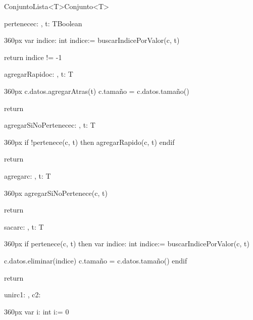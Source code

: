 \documentclass[10pt,a4paper]{article}
\begin{document}
\begin{ModuloImplements}{ConjuntoLista<T>}{Conjunto<T>}
  \begin{proc}{pertenece}{\In c: , \In t: T}{Boolean}
    \begin{ImplementationCode}{360px}
      var indice: int
          indice:= buscarIndicePorValor(c, t)

      return indice != -1
    \end{ImplementationCode}
  \end{proc}
  \begin{proc}{agregarRapido}{\Inout c: , t: T}{}
    \begin{ImplementationCode}{360px}
      c.datos.agregarAtras(t)
      c.tamaño = c.datos.tamaño()

      return
    \end{ImplementationCode}
  \end{proc}
  \begin{proc}{agregarSiNoPertenece}{\Inout c: , t: T}{}
    \begin{ImplementationCode}{360px}
      if !pertenece(c, t) then
        agregarRapido(c, t)
      endif

      return
    \end{ImplementationCode}
  \end{proc}
  \begin{proc}{agregar}{\Inout c: , t: T}{}
    \begin{ImplementationCode}{360px}
      agregarSiNoPertenece(c, t)

      return
    \end{ImplementationCode}
  \end{proc}
  \begin{proc}{sacar}{\Inout c: , t: T}{}
    \begin{ImplementationCode}{360px}
      if pertenece(c, t) then
        var indice: int
            indice:= buscarIndicePorValor(c, t)

        c.datos.eliminar(indice)
        c.tamaño = c.datos.tamaño()
      endif

      return
    \end{ImplementationCode}
  \end{proc}
  \begin{proc}{unir}{\Inout c1: , \Inout c2: }{}
    \begin{ImplementationCode}{360px}
      var i: int
          i:= 0
      

\end{ImplementationCode}
\end{proc}
\end{ModuloImplements}
\end{document}
